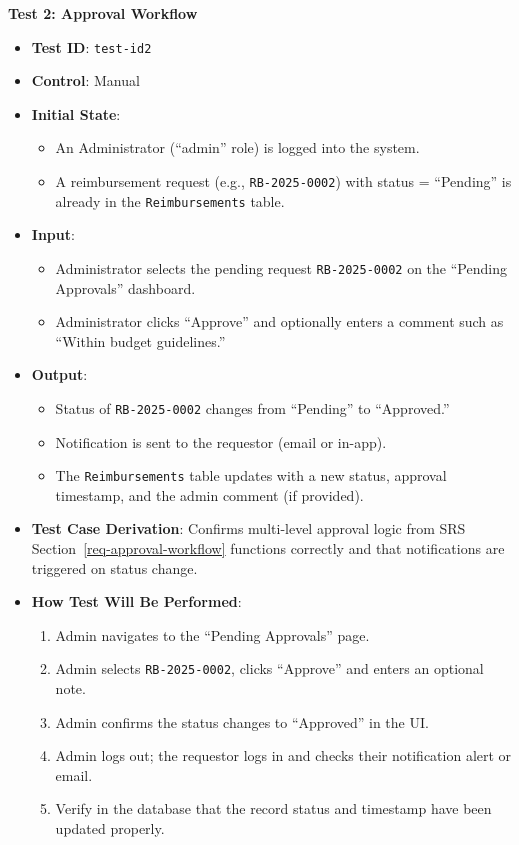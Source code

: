 \documentclass[12pt, titlepage]{article}
\begin{document}
\textbf{Test 2: Approval Workflow}
\begin{itemize}
    \item \textbf{Test ID}: \texttt{test-id2}
    \item \textbf{Control}: Manual
    \item \textbf{Initial State}:
    \begin{itemize}
        \item An Administrator (``admin'' role) is logged into the system.
        \item A reimbursement request (e.g., \texttt{RB-2025-0002}) with status = ``Pending'' is already in the \texttt{Reimbursements} table.
    \end{itemize}
    \item \textbf{Input}:
    \begin{itemize}
        \item Administrator selects the pending request \texttt{RB-2025-0002} on the ``Pending Approvals'' dashboard.
        \item Administrator clicks ``Approve'' and optionally enters a comment such as ``Within budget guidelines.''
    \end{itemize}
    \item \textbf{Output}:
    \begin{itemize}
        \item Status of \texttt{RB-2025-0002} changes from ``Pending'' to ``Approved.''
        \item Notification is sent to the requestor (email or in-app).
        \item The \texttt{Reimbursements} table updates with a new status, approval timestamp, and the admin comment (if provided).
    \end{itemize}
    \item \textbf{Test Case Derivation}:
    Confirms multi-level approval logic from SRS Section~\ref{req-approval-workflow} functions correctly and that notifications are triggered on status change.
    \item \textbf{How Test Will Be Performed}:
    \begin{enumerate}
        \item Admin navigates to the ``Pending Approvals'' page.
        \item Admin selects \texttt{RB-2025-0002}, clicks ``Approve'' and enters an optional note.
        \item Admin confirms the status changes to ``Approved'' in the UI.
        \item Admin logs out; the requestor logs in and checks their notification alert or email.
        \item Verify in the database that the record status and timestamp have been updated properly.
    \end{enumerate}
\end{itemize}
\end{document}
